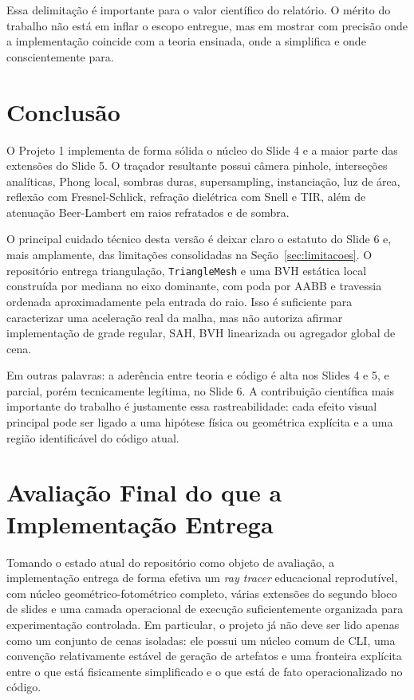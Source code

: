 \documentclass[portuguese]{sbcreviews-2025}%
\begin{document}
Essa delimitação é importante para o valor científico do relatório. O mérito do trabalho não está em inflar o escopo entregue, mas em mostrar com precisão onde a implementação coincide com a teoria ensinada, onde a simplifica e onde conscientemente para.

\section{Conclusão}
\label{sec:conclusao}

O Projeto 1 implementa de forma sólida o núcleo do Slide 4 e a maior parte das extensões do Slide 5. O traçador resultante possui câmera pinhole, interseções analíticas, Phong local, sombras duras, supersampling, instanciação, luz de área, reflexão com Fresnel-Schlick, refração dielétrica com Snell e TIR, além de atenuação Beer-Lambert em raios refratados e de sombra.

O principal cuidado técnico desta versão é deixar claro o estatuto do Slide 6 e, mais amplamente, das limitações consolidadas na Seção~\ref{sec:limitacoes}. O repositório entrega triangulação, \texttt{TriangleMesh} e uma BVH estática local construída por mediana no eixo dominante, com poda por AABB e travessia ordenada aproximadamente pela entrada do raio. Isso é suficiente para caracterizar uma aceleração real da malha, mas não autoriza afirmar implementação de grade regular, SAH, BVH linearizada ou agregador global de cena.

Em outras palavras: a aderência entre teoria e código é alta nos Slides 4 e 5, e parcial, porém tecnicamente legítima, no Slide 6. A contribuição científica mais importante do trabalho é justamente essa rastreabilidade: cada efeito visual principal pode ser ligado a uma hipótese física ou geométrica explícita e a uma região identificável do código atual.

\section{Avaliação Final do que a Implementação Entrega}
\label{sec:avaliacao-final}

Tomando o estado atual do repositório como objeto de avaliação, a implementação entrega de forma efetiva um \emph{ray tracer} educacional reprodutível, com núcleo geométrico-fotométrico completo, várias extensões do segundo bloco de slides e uma camada operacional de execução suficientemente organizada para experimentação controlada. Em particular, o projeto já não deve ser lido apenas como um conjunto de cenas isoladas: ele possui um núcleo comum de CLI, uma convenção relativamente estável de geração de artefatos e uma fronteira explícita entre o que está fisicamente simplificado e o que está de fato operacionalizado no código.
\end{document}
